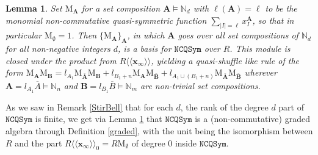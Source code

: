 \documentclass{article}
\newtheorem{lem}[thm]{Lemma}
\theoremstyle{definition}
\begin{document}
\begin{lem}
Set $\mathrm{M}_{\mathbf{A}}$ for a set composition $\mathbf{A}\vDash\mathbb{N}_{d}$ with $\ell(\mathbf{A})=\ell$ to be the \emph{monomial non-commutative quasi-symmetric function} $\sum_{|I|=\ell}x_{I}^{\mathbf{A}}$, so that in particular $\mathrm{M}_{\emptyset}=1$. Then $\{\mathrm{M}_{\mathbf{A}}\}_{\mathbf{A}}$, in which $\mathbf{A}$ goes over all set compositions of $\mathbb{N}_{d}$ for all non-negative integers $d$, is a basis for $\mathtt{NCQSym}$ over $R$. This module is closed under the product from $R\langle\langle\mathbf{x}_{\infty}\rangle\rangle$, yielding a quasi-shuffle like rule of the form $\mathrm{M}_{\mathbf{A}}\mathrm{M}_{\mathbf{B}}=l_{A_{1}}\mathrm{M}_{\bar{\mathbf{A}}}\mathrm{M}_{\mathbf{B}}+l_{B_{1}+n}\mathrm{M}_{\mathbf{A}} \mathrm{M}_{\bar{\mathbf{B}}}+l_{A_{1}\cup(B_{1}+n)}\mathrm{M}_{\bar{\mathbf{A}}}\mathrm{M}_{\bar{\mathbf{B}}}$ wherever $\mathbf{A}=l_{A_{1}}\overline{A}\vDash\mathbb{N}_{n}$ and $\mathbf{B}=l_{B_{1}}\overline{B}\vDash\mathbb{N}_{m}$ are non-trivial set compositions. \label{monNCQSym}
\end{lem}
As we saw in Remark \ref{StirBell} that for each $d$, the rank of the degree $d$ part of $\mathtt{NCQSym}$ is finite, we get via Lemma \ref{monNCQSym} that $\mathtt{NCQSym}$ is a (non-commutative) graded algebra through Definition \ref{graded}, with the unit being the isomorphism between $R$ and the part $R\langle\langle\mathbf{x}_{\infty}\rangle\rangle_{0}=R\mathrm{M}_{\emptyset}$ of degree 0 inside $\mathtt{NCQSym}$.

\medskip
\end{document}
